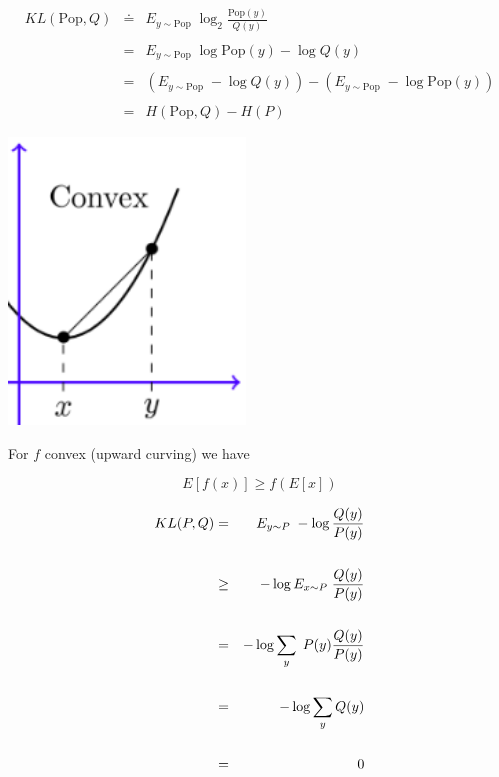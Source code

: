 {

\begin{eqnarray*}
  KL(\mathrm{Pop},Q) & \doteq & E_{y \sim \mathrm{Pop}} \;\log_2 \frac{\mathrm{Pop}(y)}{Q(y)} \\
  \\
  & = & E_{y \sim \mathrm{Pop}} \;\log \mathrm{Pop}(y) - \log Q(y) \\
  \\
  & = & \left(E_{y \sim \mathrm{Pop}} \; - \log Q(y)\right) - \left(E_{y \sim \mathrm{Pop}} \; - \log \mathrm{Pop}(y)\right) \\
  \\
  & = & H(\mathrm{Pop},Q) - H(P)
\end{eqnarray*}


\centerline{\includegraphics[height = 3.0in]{../images/Jensen}}

\vfill
For $f$ convex (upward curving) we have

\vfill
$$E[f(x)] \geq f(E[x])$$


\begin{eqnarray*}
  KL(P,Q) & = & E_{y \sim P}\;- \log \frac{Q(y)}{P(y)} \\
  \\
  & \geq & - \log E_{x\sim P}\;\frac{Q(y)}{P(y)} \\
  \\
  & = & - \log \sum_y\; P(y) \frac{Q(y)}{P(y)}  \\
  \\
  & = & - \log \sum_y Q(y) \\
  \\
  & = & 0
\end{eqnarray*}

}

